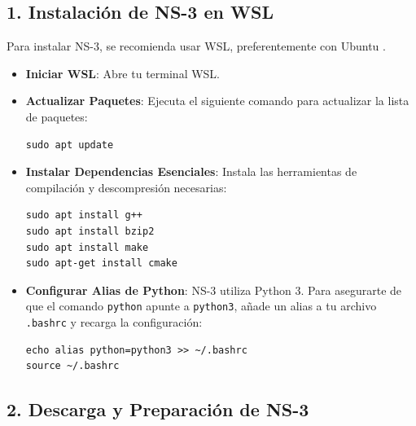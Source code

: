 \documentclass{article}
\begin{document}
\subsection*{\textbf{1. Instalación de NS-3 en WSL}}
Para instalar NS-3, se recomienda usar WSL, preferentemente con Ubuntu .

\begin{itemize}
    \item \textbf{Iniciar WSL}: Abre tu terminal WSL.
    \item \textbf{Actualizar Paquetes}: Ejecuta el siguiente comando para actualizar la lista de paquetes:
    \begin{lstlisting}
sudo apt update
    \end{lstlisting}
    \item \textbf{Instalar Dependencias Esenciales}: Instala las herramientas de compilación y descompresión necesarias:
    \begin{lstlisting}
sudo apt install g++
sudo apt install bzip2
sudo apt install make
sudo apt-get install cmake
    \end{lstlisting}
    \item \textbf{Configurar Alias de Python}: NS-3 utiliza Python 3. Para asegurarte de que el comando \texttt{python} apunte a \texttt{python3}, añade un alias a tu archivo \texttt{.bashrc} y recarga la configuración:
    \begin{lstlisting}
echo alias python=python3 >> ~/.bashrc
source ~/.bashrc
    \end{lstlisting}
\end{itemize}

\subsection*{\textbf{2. Descarga y Preparación de NS-3}}
\end{document}
